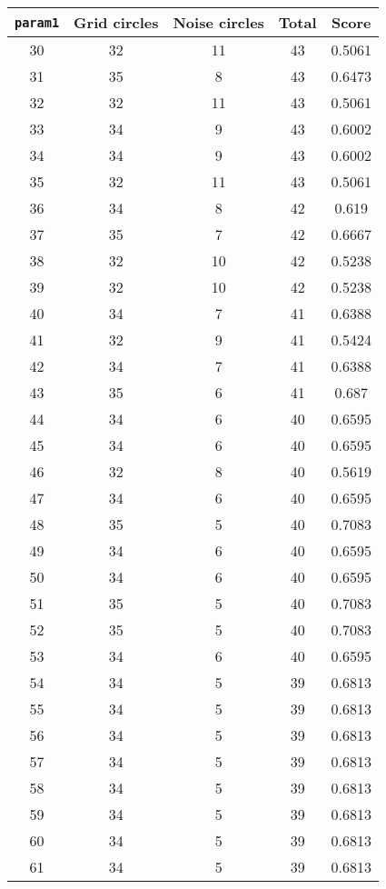 \documentclass[letterpaper, 12pt]{article}
\begin{document}
\begin{longtable}{|c|c|c|c|c|}
\hline
\textbf{\texttt{param1}} & \textbf{Grid circles} & \textbf{Noise circles} & \textbf{Total} & \textbf{Score} \\
\hline
30 & 32 & 11 & 43 & 0.5061 \\
\hline
31 & 35 & 8 & 43 & 0.6473 \\
\hline
32 & 32 & 11 & 43 & 0.5061 \\
\hline
33 & 34 & 9 & 43 & 0.6002 \\
\hline
34 & 34 & 9 & 43 & 0.6002 \\
\hline
35 & 32 & 11 & 43 & 0.5061 \\
\hline
36 & 34 & 8 & 42 & 0.619 \\
\hline
37 & 35 & 7 & 42 & 0.6667 \\
\hline
38 & 32 & 10 & 42 & 0.5238 \\
\hline
39 & 32 & 10 & 42 & 0.5238 \\
\hline
40 & 34 & 7 & 41 & 0.6388 \\
\hline
41 & 32 & 9 & 41 & 0.5424 \\
\hline
42 & 34 & 7 & 41 & 0.6388 \\
\hline
43 & 35 & 6 & 41 & 0.687 \\
\hline
44 & 34 & 6 & 40 & 0.6595 \\
\hline
45 & 34 & 6 & 40 & 0.6595 \\
\hline
46 & 32 & 8 & 40 & 0.5619 \\
\hline
47 & 34 & 6 & 40 & 0.6595 \\
\hline
48 & 35 & 5 & 40 & 0.7083 \\
\hline
49 & 34 & 6 & 40 & 0.6595 \\
\hline
50 & 34 & 6 & 40 & 0.6595 \\
\hline
51 & 35 & 5 & 40 & 0.7083 \\
\hline
52 & 35 & 5 & 40 & 0.7083 \\
\hline
53 & 34 & 6 & 40 & 0.6595 \\
\hline
54 & 34 & 5 & 39 & 0.6813 \\
\hline
55 & 34 & 5 & 39 & 0.6813 \\
\hline
56 & 34 & 5 & 39 & 0.6813 \\
\hline
57 & 34 & 5 & 39 & 0.6813 \\
\hline
58 & 34 & 5 & 39 & 0.6813 \\
\hline
59 & 34 & 5 & 39 & 0.6813 \\
\hline
60 & 34 & 5 & 39 & 0.6813 \\
\hline
61 & 34 & 5 & 39 & 0.6813 \\

\end{longtable}
\end{document}

